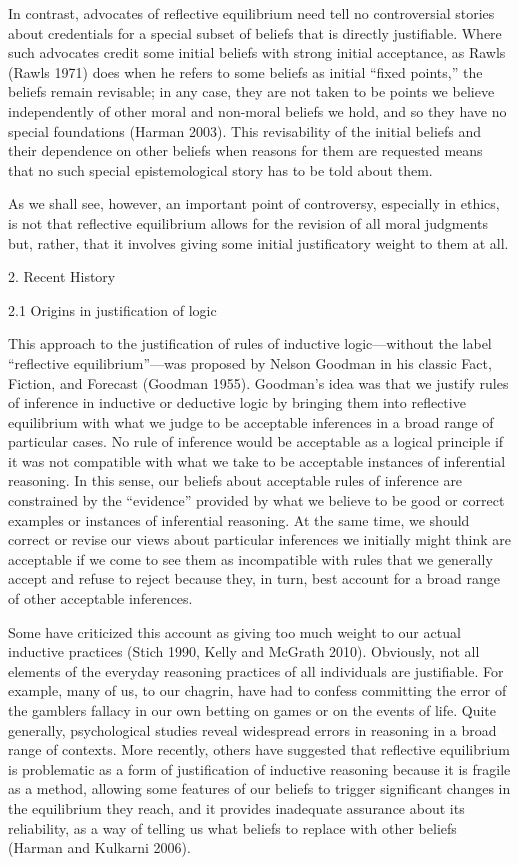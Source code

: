 \documentclass[]{article}
\begin{document}
In contrast, advocates of reflective equilibrium need tell no
controversial stories about credentials for a special subset of beliefs
that is directly justifiable. Where such advocates credit some initial
beliefs with strong initial acceptance, as Rawls (Rawls 1971) does when
he refers to some beliefs as initial ``fixed points,'' the beliefs
remain revisable; in any case, they are not taken to be points we
believe independently of other moral and non-moral beliefs we hold, and
so they have no special foundations (Harman 2003). This revisability of
the initial beliefs and their dependence on other beliefs when reasons
for them are requested means that no such special epistemological story
has to be told about them.

As we shall see, however, an important point of controversy, especially
in ethics, is not that reflective equilibrium allows for the revision of
all moral judgments but, rather, that it involves giving some initial
justificatory weight to them at all.

\protect\hypertarget{RecHis}{}{2. Recent History}

\protect\hypertarget{OriJusLog}{}{2.1 Origins in justification of logic}

This approach to the justification of rules of inductive logic---without
the label ``reflective equilibrium''---was proposed by Nelson Goodman in
his classic Fact, Fiction, and Forecast (Goodman 1955). Goodman's idea
was that we justify rules of inference in inductive or deductive logic
by bringing them into reflective equilibrium with what we judge to be
acceptable inferences in a broad range of particular cases. No rule of
inference would be acceptable as a logical principle if it was not
compatible with what we take to be acceptable instances of inferential
reasoning. In this sense, our beliefs about acceptable rules of
inference are constrained by the ``evidence'' provided by what we
believe to be good or correct examples or instances of inferential
reasoning. At the same time, we should correct or revise our views about
particular inferences we initially might think are acceptable if we come
to see them as incompatible with rules that we generally accept and
refuse to reject because they, in turn, best account for a broad range
of other acceptable inferences.

Some have criticized this account as giving too much weight to our
actual inductive practices (Stich 1990, Kelly and McGrath 2010).
Obviously, not all elements of the everyday reasoning practices of all
individuals are justifiable. For example, many of us, to our chagrin,
have had to confess committing the error of the gamblers fallacy in our
own betting on games or on the events of life. Quite generally,
psychological studies reveal widespread errors in reasoning in a broad
range of contexts. More recently, others have suggested that reflective
equilibrium is problematic as a form of justification of inductive
reasoning because it is fragile as a method, allowing some features of
our beliefs to trigger significant changes in the equilibrium they
reach, and it provides inadequate assurance about its reliability, as a
way of telling us what beliefs to replace with other beliefs (Harman and
Kulkarni 2006).
\end{document}
